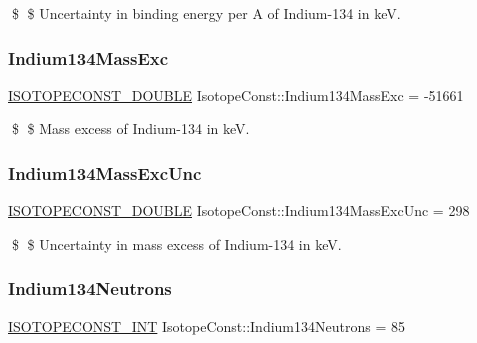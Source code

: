 \$ \$ Uncertainty in binding energy per A of Indium-\/134 in keV. \mbox{\label{group___isotope_const-_indium-_in134_ga314ab101ef0affced9cf695f24e58b58}} 
\subsubsection{\texorpdfstring{Indium134\+Mass\+Exc}{Indium134MassExc}}
{\footnotesize\ttfamily \mbox{\hyperlink{group___isotope_const-_macros_ga8f45a7272ce02c0b4c65c44636ed719a}{I\+S\+O\+T\+O\+P\+E\+C\+O\+N\+S\+T\+\_\+\+D\+O\+U\+B\+LE}} Isotope\+Const\+::\+Indium134\+Mass\+Exc = -\/51661}

\$ \$ Mass excess of Indium-\/134 in keV. \mbox{\label{group___isotope_const-_indium-_in134_ga3ed612b0eb02683d0c2a69b55e74d331}} 
\subsubsection{\texorpdfstring{Indium134\+Mass\+Exc\+Unc}{Indium134MassExcUnc}}
{\footnotesize\ttfamily \mbox{\hyperlink{group___isotope_const-_macros_ga8f45a7272ce02c0b4c65c44636ed719a}{I\+S\+O\+T\+O\+P\+E\+C\+O\+N\+S\+T\+\_\+\+D\+O\+U\+B\+LE}} Isotope\+Const\+::\+Indium134\+Mass\+Exc\+Unc = 298}

\$ \$ Uncertainty in mass excess of Indium-\/134 in keV. \mbox{\label{group___isotope_const-_indium-_in134_gae0ddb36c0068dcb00d67b3bc607570a7}} 
\subsubsection{\texorpdfstring{Indium134\+Neutrons}{Indium134Neutrons}}
{\footnotesize\ttfamily \mbox{\hyperlink{group___isotope_const-_macros_ga5f18360b3e99483a35c32d789e62621c}{I\+S\+O\+T\+O\+P\+E\+C\+O\+N\+S\+T\+\_\+\+I\+NT}} Isotope\+Const\+::\+Indium134\+Neutrons = 85}

